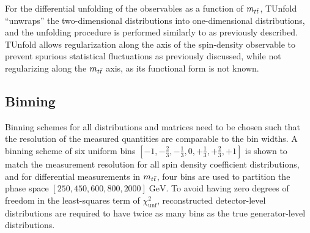 \begin{refsection}

For the differential unfolding of the observables as a function of $m_{t\bar{t}}$, TUnfold ``unwraps'' the two-dimensional distributions into one-dimensional distributions, and the unfolding procedure is performed similarly to as previously described. 
TUnfold allows regularization along the axis of the spin-density observable to prevent spurious statistical fluctuations as previously discussed, while not regularizing along the $m_{t\bar{t}}$ axis, as its functional form is not known.


\subsection{Binning}
\label{Binning}
Binning schemes for all distributions and matrices need to be chosen such that the resolution of the measured quantities are comparable to the bin widths.
A binning scheme of six uniform bins $[-1,-\frac{2}{3},-\frac{1}{3},0,+\frac{1}{3},+\frac{2}{3},+1]$ is shown to match the measurement resolution for all spin density coefficient distributions, and for differential measurements in $m_{t\bar{t}}$, four bins are used to partition the phase space $[250,450,600,800,2000] \; \si{\GeV}$.
To avoid having zero degrees of freedom in the least-squares term of $\chi^{2}_{\text{unf}}$, reconstructed detector-level distributions are required to have twice as many bins as the true generator-level distributions.


\end{refsection}
